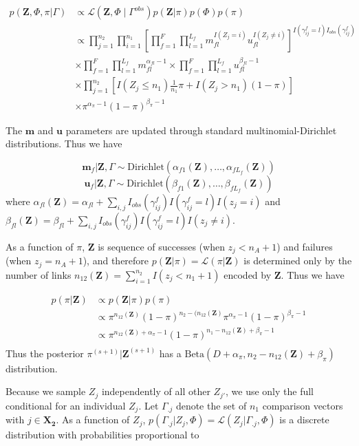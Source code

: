 \documentclass[ba]{imsart}
\begin{document}
\begin{align*}
	p(\bm{Z}, \Phi, \pi|\Gamma) &\propto \mathcal{L}(\bm{Z}, \Phi \mid \Gamma^{obs}) p(\bm{Z} | \pi) p(\Phi) p(\pi) \\
	&\propto \prod_{j=1}^{n_2}  \prod_{i=1}^{n_1}\left[ \prod_{f=1}^{F}\prod_{l=1}^{L_f} m_{fl}^{I(Z_j = i)}u_{fl}^{I(Z_j \neq i)}\right]^{I(\gamma_{ij}^f = l)I_{obs}(\gamma_{ij}^f)} \\
	&\times  \prod_{f=1}^{F}\prod_{l=1}^{L_f} m_{fl}^{\alpha_{fl} - 1}  \times\prod_{f=1}^{F}\prod_{l=1}^{L_f} u_{fl}^{\beta_{fl} - 1} \\
	&\times \prod_{j=1}^{n_2} \left[I(Z_j \leq n_1)\frac{1}{n_1}\pi + I(Z_j > n_1)(1 - \pi)\right] \\
	&\times \pi^{\alpha_{\pi} -1} (1-\pi)^{\beta_{\pi} -1}
\end{align*}

The $\bm{m}$ and $\bm{u}$ parameters are updated through standard multinomial-Dirichlet distributions. Thus we have

$$\bm{m}_f|\bm{Z}, \Gamma \sim \text{Dirichlet}(\alpha_{f1}(\bm{Z}), \ldots, \alpha_{fL_f}(\bm{Z}))$$
$$\bm{u}_f|\bm{Z}, \Gamma \sim \text{Dirichlet}(\beta_{f1}(\bm{Z}), \ldots, \beta_{fL_f}(\bm{Z}))$$
where
\(\alpha_{fl}(\bm{Z})= \alpha_{fl} + \sum_{i,j} I_{obs}(\gamma_{ij}^f)I(\gamma_{ij}^f = l) I(z_j = i)\)
and
\(\beta_{fl}(\bm{Z})= \beta_{fl} + \sum_{i,j} I_{obs}(\gamma_{ij}^f)I(\gamma_{ij}^f = l) I(z_j \neq i)\).

As a function of \(\pi\), \(\bm{Z}\) is sequence of successes (when \(z_j < n_A + 1\)) and failures (when \(z_j = n_A + 1\)), and therefore \(p(\bm{Z}|\pi) = \mathcal{L}(\pi|\bm{Z})\) is determined only by the number of links $n_{12}(\bm{Z}) = \sum_{i=1}^{n_2}I(z_j < n_1 + 1)$ encoded by $\bm{Z}$. Thus we have

\begin{align*}
p(\pi | \bm{Z}) &\propto p(\bm{Z}|\pi)p(\pi) \\
&\propto \pi^{n_{12}(\bm{Z})} (1-\pi)^{n_2 - (n_{12}(\bm{Z})} \pi^{\alpha_{\pi} -1} (1-\pi)^{\beta_{\pi} -1} \\
&\propto \pi^{n_{12}(\bm{Z}) + \alpha_{\pi} - 1} (1-\pi)^{n_1 - n_{12}(\bm{Z}) + \beta_{\pi} -1} \\
\end{align*}
Thus the posterior $\pi^{(s+1)}|\bm{Z}^{(s+1)}$ has a $\text{Beta}(D + \alpha_{\pi}, n_2 - n_{12}(\bm{Z}) + \beta_{\pi})$ distribution.

Because we sample \(Z_j\) independently of all other \(Z_{j'}\), we use
only the full conditional for an individual \(Z_j\). Let \(\Gamma_{.j}\)
denote the set of \(n_1\) comparison vectors with \(j \in \bm{X_2}\).  As a function of \(Z_j\), 
\(p(\Gamma_{.j}|Z_j, \Phi) = \mathcal{L}(Z_j|\Gamma_{.j}, \Phi)\)
is a discrete distribution with probabilities proportional to
\end{document}
